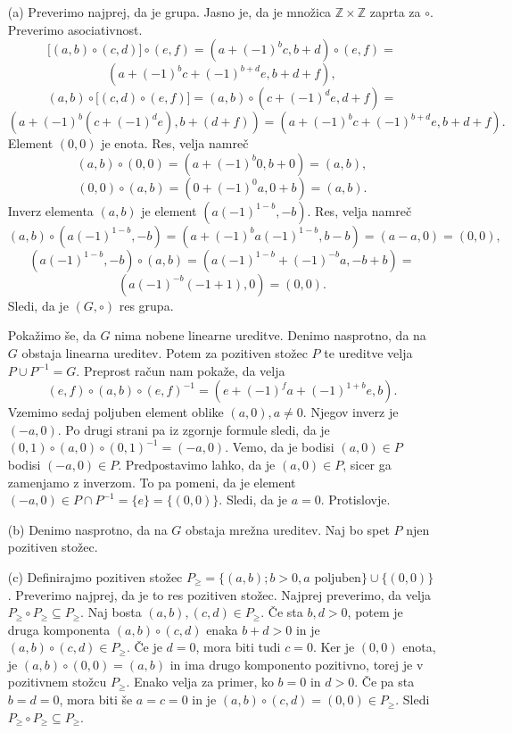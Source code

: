 \documentclass[a4paper, 12pt]{article}
\newcommand{\Z}{\mathbb{Z}}
\begin{document}
\begin{enumerate}
\item[(a)] Preverimo najprej, da je grupa. Jasno je, da je množica $\Z \times \Z$ zaprta za $\circ$. Preverimo asociativnost.
$$
\big[(a,b)\circ (c,d)\big] \circ (e,f) = (a+(-1)^b c, b+d) \circ (e,f) =
$$
$$
(a+(-1)^b c+ (-1)^{b+d}e, b+d+f),
$$
$$
(a,b)\circ \big[ (c,d) \circ (e,f) \big] = (a,b) \circ (c+(-1)^d e, d+f) =
$$
$$
(a+(-1)^b (c+(-1)^de), b+(d+f)) = (a+ (-1)^b c + (-1)^{b+d} e, b+d+f).
$$
Element $(0,0)$ je enota. Res, velja namreč
$$
(a,b)\circ (0,0) = (a+(-1)^b 0, b+0) = (a,b),
$$
$$
(0,0) \circ (a,b) = (0+(-1)^0 a, 0+b) = (a,b). 
$$
Inverz elementa $(a,b)$ je element $(a(-1)^{1-b},-b)$. Res, velja namreč
$$
(a,b) \circ (a(-1)^{1-b},-b) = (a+(-1)^b a (-1)^{1-b}, b-b) = (a-a,0 )= (0,0),
$$
$$
(a(-1)^{1-b}, -b) \circ (a,b) = (a(-1)^{1-b}+(-1)^{-b}a,-b+b)=
$$
$$
(a(-1)^{-b}(-1+1),0 ) = (0,0).
$$
Sledi, da je $(G,\circ)$ res grupa.

Pokažimo še, da $G$ nima nobene linearne ureditve. Denimo nasprotno, da na $G$ obstaja linearna ureditev. Potem za pozitiven stožec $P$ te ureditve velja $P\cup P^{-1} = G$. Preprost račun nam pokaže, da velja
$$
(e,f) \circ (a,b) \circ (e,f)^{-1} = (e+(-1)^f a + (-1)^{1+b} e,b).
$$
Vzemimo sedaj poljuben element oblike $(a,0), a\neq 0$. Njegov inverz je $(-a,0)$. Po drugi strani pa iz zgornje formule sledi, da je $(0,1)\circ(a,0)\circ (0,1)^{-1} = (-a,0)$. Vemo, da je bodisi $(a,0) \in P$ bodisi $(-a,0)\in P$. Predpostavimo lahko, da je $(a,0) \in P$, sicer ga zamenjamo z inverzom.  To pa pomeni, da je element $(-a,0) \in P\cap P^{-1} = \{e\} = \{(0,0)\}$. Sledi, da je $a=0$. Protislovje.

\item[(b)] Denimo nasprotno, da na $G$ obstaja mrežna ureditev. Naj bo spet $P$ njen pozitiven stožec.

\item[(c)] Definirajmo pozitiven stožec $P_{\ge} = \{(a,b); b > 0, a \text{ poljuben}\} \cup \{(0,0)\}$. Preverimo najprej, da je to res pozitiven stožec. Najprej preverimo, da velja $P_{\ge} \circ P_{\ge} \subseteq P_{ \ge}$. Naj bosta $(a,b), (c,d) \in P_{\ge}$. Če sta $b,d > 0$, potem je druga komponenta $(a,b)\circ (c,d)$ enaka $b+d > 0$ in je $(a,b)\circ (c,d) \in P_{\ge}$. Če je $d=0$, mora biti tudi $c=0$. Ker je $(0,0)$ enota, je $(a,b)\circ (0,0) = (a,b)$ in ima drugo komponento pozitivno, torej je v pozitivnem stožcu $P_{\ge}$. Enako velja za primer, ko $b=0$ in $d>0$. Če pa sta $b=d=0$, mora biti še $a=c=0$ in je $(a,b)\circ(c,d) = (0,0) \in P_{\ge}$. Sledi $P_{\ge} \circ P_{\ge} \subseteq P_{\ge}$.


\end{enumerate}
\end{document}

